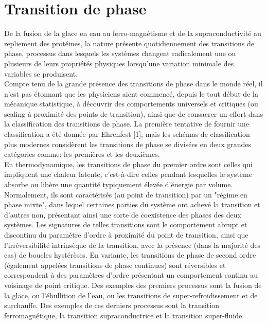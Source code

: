 \section{Transition de phase}
De la fusion de la glace en eau au ferro-magnétisme et de la supraconductivité au repliement des protéines, la nature présente quotidiennement des transitions de phase, processus dans lesquels les systèmes changent radicalement une ou plusieurs de leurs propriétés physiques lorsqu'une variation minimale des variables se produisent.\\
Compte tenu de la grande présence des transitions de phase dans le monde réel, il n'est pas étonnant que les physiciens aient commencé, depuis le tout début de la mécanique statistique, à découvrir des comportements universels et critiques (ou scaling à proximité des points de transition), ainsi que de consacrer un effort dans la classification des transitions de phase. La première tentative de fournir une classification a été donnée par Ehrenfest [1], mais les schémas de classification plus modernes considèrent les transitions de phase se divisées en deux grandes catégories comme: les premières et les deuxièmes.\\
En thermodynamique, les transitions de phase du premier ordre sont celles qui impliquent une chaleur latente, c'est-à-dire celles pendant lesquelles le système absorbe ou libère une quantité typiquement élevée d'énergie par volume. Normalement, ils sont caractérisés (au point de transition) par un "régime en phase mixte", dans lequel certaines parties du système ont achevé la transition et d'autres non, présentant ainsi une sorte de coexistence des phases des deux systèmes. Les signatures de telles transitions sont le comportement abrupt et discontinu du paramètre d'ordre à proximité du point de transition, ainsi que l'irréversibilité intrinsèque de la transition, avec la présence (dans la majorité des cas) de boucles hystérèses. En variante, les transitions de phase de second ordre (également appelées transitions de phase continues) sont réversibles et correspondent à des paramètres d'ordre présentant un comportement continu au voisinage de point critique. Des exemples des premiers processus sont la fusion de la glace, ou l'ébullition de l'eau, ou les transitions de super-refroidissement et de surchauffe. Des exemples de ces derniers processus sont la transition ferromagnétique, la transition supraconductrice et la transition super-fluide.
